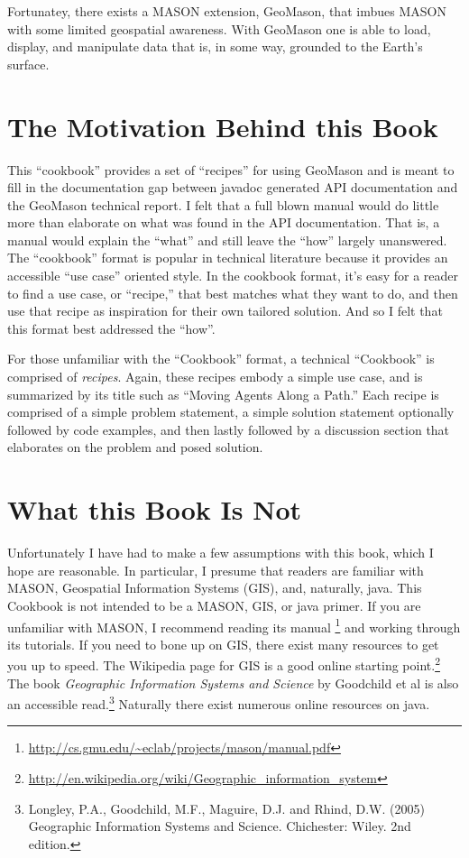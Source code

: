 \documentclass[twoside,10pt]{book}
\begin{document}
Fortunatey, there exists a MASON extension, GeoMason, that imbues
MASON with some limited geospatial awareness.  With GeoMason one is
able to load, display, and manipulate data that is, in some way,
grounded to the Earth's surface.
\section{The Motivation Behind this Book}
This ``cookbook'' provides a set of ``recipes'' for using GeoMason and is
meant to fill in the documentation gap between javadoc generated API
documentation and the GeoMason technical report.  I felt that a full
blown manual would do little more than elaborate on what was found in
the API documentation.  That is, a manual would explain the
``what'' and still leave the ``how'' largely unanswered.  The ``cookbook''
format is popular in technical literature because it provides an
accessible ``use case'' oriented style.  In the cookbook format, it's
easy for a reader to find a use case, or ``recipe,'' that best matches what
they want to do, and then use that recipe as inspiration for their own
tailored solution.  And so I felt that this format best addressed the
``how''.

For those unfamiliar with the ``Cookbook'' format, a technical
``Cookbook'' is comprised of \emph{recipes}.  Again, these recipes
embody a simple use case, and is summarized by its title such as
``Moving Agents Along a Path.''  Each recipe is comprised of a simple
problem statement, a simple solution statement optionally followed by
code examples, and then lastly followed by a discussion section that
elaborates on the problem and posed solution.

\section{What this Book Is Not}

Unfortunately I have had to make a few assumptions with this book,
which I hope are reasonable.  In particular, I presume that readers
are familiar with MASON, Geospatial Information Systems (GIS), and,
naturally, java.  This Cookbook is not intended to be a MASON, GIS, or
java primer.  If you are unfamiliar with MASON, I recommend reading
its manual
\footnote{\url{http://cs.gmu.edu/~eclab/projects/mason/manual.pdf}}
and working through its tutorials.  If you need to bone up on GIS,
there exist many resources to get you up to speed.  The Wikipedia page
for GIS is a good online starting
point.\footnote{\url{http://en.wikipedia.org/wiki/Geographic_information_system}}
The book \emph{Geographic Information Systems and Science} by
Goodchild et al is also an accessible read.\footnote{Longley, P.A.,
  Goodchild, M.F., Maguire, D.J. and Rhind, D.W. (2005) Geographic
  Information Systems and Science. Chichester: Wiley. 2nd edition.}
Naturally there exist numerous online resources on java.
\end{document}

